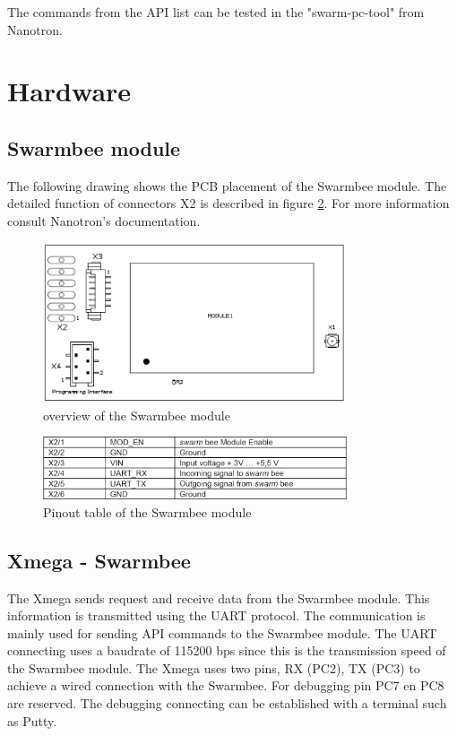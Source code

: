 \documentclass[a4paper, 10pt]{article} %
\begin{document}
The commands from the API list can be tested in the "swarm-pc-tool" from Nanotron.


\section*{Hardware}
\subsection*{Swarmbee module}
The following drawing shows the PCB placement of the Swarmbee module. The detailed function of connectors X2 is described in figure \ref{table}. For more information consult Nanotron's documentation.

\begin{figure}[H]
  \centering
      \includegraphics[width=0.8\textwidth]{module.png}
  \caption{overview of the Swarmbee module }
  \label{module}
\end{figure}

\begin{figure}[H]
  \centering
      \includegraphics[width=0.8\textwidth]{table.png}
  \caption{Pinout table of the Swarmbee module}
  \label{table}
\end{figure}


\subsection*{Xmega - Swarmbee}
The Xmega sends request and receive data from the
Swarmbee module. This information is transmitted using the UART protocol.
The communication is mainly used for sending API commands to the Swarmbee
module. The UART connecting uses a baudrate of 115200 bps since this is the
transmission speed of the Swarmbee module. The Xmega uses two pins, RX
(PC2), TX (PC3) to achieve a wired connection with the Swarmbee. For debugging pin PC7 en PC8 are reserved. The debugging connecting can be established with a terminal such as Putty.
\end{document}
